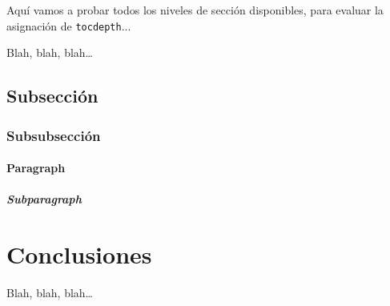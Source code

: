 Aquí vamos a probar todos los niveles de sección disponibles, para evaluar la asignación de \texttt{tocdepth}...

Blah, blah, blah\ldots


\subsection{Subsección}
\label{sec:subseccion}


\subsubsection{Subsubsección}
\label{sec:subsubseccion}

\paragraph{Paragraph}
\label{sec:paragraph-1}


\subparagraph{Subparagraph}
\label{sec:subparagraph}



\section{Conclusiones}
\label{sec:conclusiones-teoria}

Blah, blah, blah\ldots



%
%
%
% 
%
%
%
%


